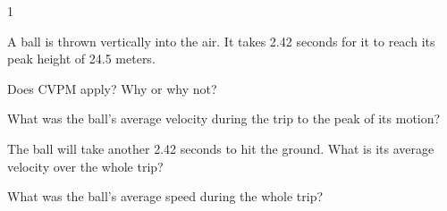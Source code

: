 
\AddToShipoutPicture*{\BackgroundPic}

\addtocounter {ProbNum} {1}

 
{\bf \Large{}} A ball is thrown vertically into the air.  It takes 2.42 seconds for it to reach its peak height of 24.5 meters.

\bigskip
Does CVPM apply? Why or why not?

\vspace{30mm}
What was the ball's average velocity during the trip to the peak of its motion?

\vfill
The ball will take another 2.42 seconds to hit the ground.  What is its average velocity over the whole trip?

\vfill
What was the ball's average speed during the whole trip?

 
\vfill

\newpage